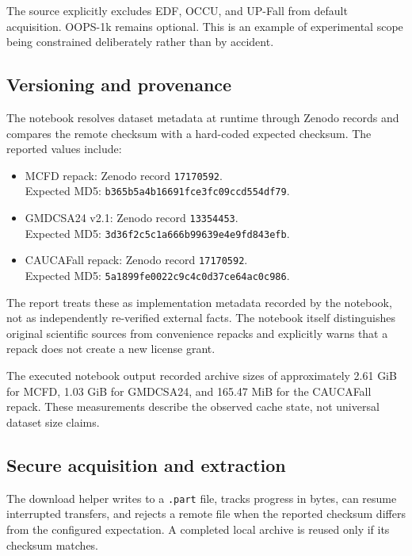 \documentclass[11pt,a4paper]{article}
\newcommand{\code}[1]{\texttt{#1}}
\begin{document}
The source explicitly excludes EDF, OCCU, and UP-Fall from default acquisition. OOPS-1k remains optional. This is an example of experimental scope being constrained deliberately rather than by accident.

\subsection{Versioning and provenance}

The notebook resolves dataset metadata at runtime through Zenodo records and compares the remote checksum with a hard-coded expected checksum. The reported values include:

\begin{itemize}[leftmargin=1.5em]
\item MCFD repack: Zenodo record \code{17170592}.\\[-2pt]
Expected MD5: \code{b365b5a4b16691fce3fc09ccd554df79}.
\item GMDCSA24 v2.1: Zenodo record \code{13354453}.\\[-2pt]
Expected MD5: \code{3d36f2c5c1a666b99639e4e9fd843efb}.
\item CAUCAFall repack: Zenodo record \code{17170592}.\\[-2pt]
Expected MD5: \code{5a1899fe0022c9c4c0d37ce64ac0c986}.
\end{itemize}

The report treats these as implementation metadata recorded by the notebook, not as independently re-verified external facts. The notebook itself distinguishes original scientific sources from convenience repacks and explicitly warns that a repack does not create a new license grant.

The executed notebook output recorded archive sizes of approximately 2.61 GiB for MCFD, 1.03 GiB for GMDCSA24, and 165.47 MiB for the CAUCAFall repack. These measurements describe the observed cache state, not universal dataset size claims.

\subsection{Secure acquisition and extraction}

The download helper writes to a \code{.part} file, tracks progress in bytes, can resume interrupted transfers, and rejects a remote file when the reported checksum differs from the configured expectation. A completed local archive is reused only if its checksum matches.
\end{document}
